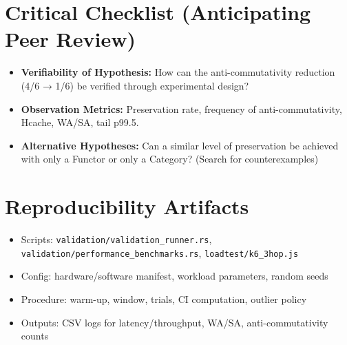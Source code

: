 \documentclass[10pt]{article}
\begin{document}
\section{Critical Checklist (Anticipating Peer Review)}
\begin{itemize}
    \item \textbf{Verifiability of Hypothesis:} How can the anti-commutativity reduction (4/6 → 1/6) be verified through experimental design?
    \item \textbf{Observation Metrics:} Preservation rate, frequency of anti-commutativity, Hcache, WA/SA, tail p99.5.
    \item \textbf{Alternative Hypotheses:} Can a similar level of preservation be achieved with only a Functor or only a Category? (Search for counterexamples)
\end{itemize}

\section{Reproducibility Artifacts}\label{app:repro}
\begin{itemize}[nosep]
    \item Scripts: \texttt{validation/validation_runner.rs}, \texttt{validation/performance_benchmarks.rs}, \texttt{loadtest/k6_3hop.js}
    \item Config: hardware/software manifest, workload parameters, random seeds
    \item Procedure: warm-up, window, trials, CI computation, outlier policy
    \item Outputs: CSV logs for latency/throughput, WA/SA, anti-commutativity counts
\end{itemize}
\end{document}
